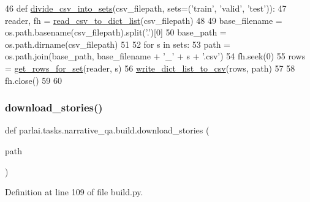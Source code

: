 \begin{DoxyCode}
46 \textcolor{keyword}{def }\hyperlink{namespaceparlai_1_1tasks_1_1narrative__qa_1_1build_a104cbf949215e7b505c73b33017b1970}{divide\_csv\_into\_sets}(csv\_filepath, sets=(\textcolor{stringliteral}{'train'}, \textcolor{stringliteral}{'valid'}, \textcolor{stringliteral}{'test'})):
47     reader, fh = \hyperlink{namespaceparlai_1_1tasks_1_1narrative__qa_1_1build_a7fae633ea705d970c2a6d56b7004f6cd}{read\_csv\_to\_dict\_list}(csv\_filepath)
48 
49     base\_filename = os.path.basename(csv\_filepath).split(\textcolor{stringliteral}{'.'})[0]
50     base\_path = os.path.dirname(csv\_filepath)
51 
52     \textcolor{keywordflow}{for} s \textcolor{keywordflow}{in} sets:
53         path = os.path.join(base\_path, base\_filename + \textcolor{stringliteral}{'\_'} + s + \textcolor{stringliteral}{'.csv'})
54         fh.seek(0)
55         rows = \hyperlink{namespaceparlai_1_1tasks_1_1narrative__qa_1_1build_a8d4e1f30e3de3f62c039296cbed12e8d}{get\_rows\_for\_set}(reader, s)
56         \hyperlink{namespaceparlai_1_1tasks_1_1narrative__qa_1_1build_ab49502ac724edd933f89bec8f414b452}{write\_dict\_list\_to\_csv}(rows, path)
57 
58     fh.close()
59 
60 
\end{DoxyCode}
\mbox{\label{namespaceparlai_1_1tasks_1_1narrative__qa_1_1build_afd6f28e1efb7e9f3328eef166f8be5cb}} 
\subsubsection{\texorpdfstring{download\+\_\+stories()}{download\_stories()}}
{\footnotesize\ttfamily def parlai.\+tasks.\+narrative\+\_\+qa.\+build.\+download\+\_\+stories (\begin{DoxyParamCaption}\item[{}]{path }\end{DoxyParamCaption})}



Definition at line 109 of file build.\+py.


